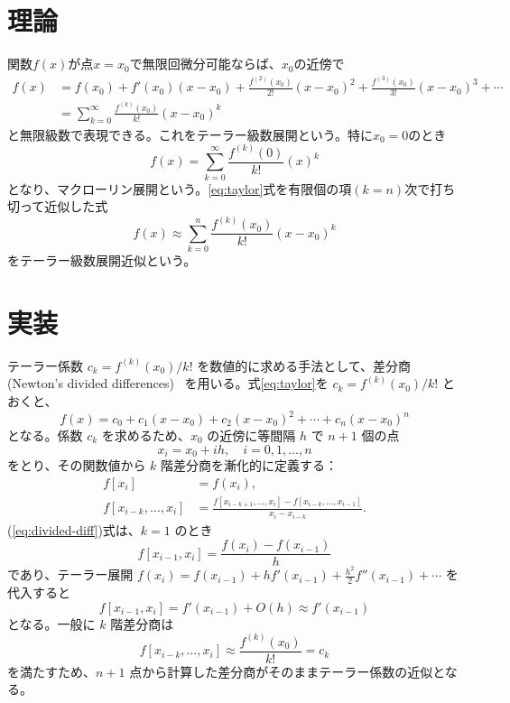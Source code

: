 \documentclass[12pt,a4paper]{ltjsreport}
\begin{document}
\section{理論}
関数$f(x)$が点$x=x_0$で無限回微分可能ならば、$x_0$の近傍で
\begin{equation}\label{eq:taylor}
\begin{split}
f(x) &= f(x_0) + f'(x_0)(x - x_0) + \frac{f^{(2)}(x_0)}{2!}(x - x_0)^2 + \frac{f^{(3)}(x_0)}{3!}(x - x_0)^3 + \cdots \\
&= \sum_{k=0}^{\infty}\frac{f^{(k)}(x_0)}{k!}(x - x_0)^k
\end{split}
\end{equation}
と無限級数で表現できる。これをテーラー級数展開という。特に$x_0 = 0$のとき
\begin{equation}\label{eq:macraulin}
f(x) = \sum_{k=0}^{\infty}\frac{f^{(k)}(0)}{k!}(x)^k
\end{equation}
となり、マクローリン展開という。\ref{eq:taylor}式を有限個の項$(k = n)$次で打ち切って近似した式
\begin{equation}
f(x) \approx \sum_{k=0}^{n}\frac{f^{(k)}(x_0)}{k!}(x - x_0)^k
\end{equation}
をテーラー級数展開近似という。

\section{実装}
テーラー係数 $c_k = f^{(k)}(x_0)/k!$ を数値的に求める手法として、差分商 (Newton's divided differences)~\cite{wikipedia_dd} を用いる。式\ref{eq:taylor}を $c_k = f^{(k)}(x_0)/k!$ とおくと、
\begin{equation}
f(x) = c_0 + c_1(x - x_0) + c_2(x - x_0)^2 + \cdots + c_n (x - x_0)^n
\end{equation}
となる。係数 $c_k$ を求めるため、$x_0$ の近傍に等間隔 $h$ で $n+1$ 個の点
\begin{equation}
x_i = x_0 + i h, \quad i = 0, 1, \ldots, n
\end{equation}
をとり、その関数値から $k$ 階差分商を漸化的に定義する：
\begin{equation}\label{eq:divided-diff}
\begin{split}
f[x_i] &= f(x_i), \\
f[x_{i-k}, \ldots, x_i] &= \frac{f[x_{i-k+1}, \ldots, x_i] - f[x_{i-k}, \ldots, x_{i-1}]}{x_i - x_{i-k}}.
\end{split}
\end{equation}
(\ref{eq:divided-diff})式は、$k=1$ のとき
\begin{equation}
f[x_{i-1}, x_i] = \frac{f(x_i) - f(x_{i-1})}{h}
\end{equation}
であり、テーラー展開 $f(x_i) = f(x_{i-1}) + h f'(x_{i-1}) + \frac{h^2}{2} f''(x_{i-1}) + \cdots$ を代入すると
\begin{equation}
f[x_{i-1}, x_i] = f'(x_{i-1}) + O(h) \approx f'(x_{i-1})
\end{equation}
となる。一般に $k$ 階差分商は
\begin{equation}
f[x_{i-k}, \ldots, x_i] \approx \frac{f^{(k)}(x_0)}{k!} = c_k
\end{equation}
を満たすため、$n+1$ 点から計算した差分商がそのままテーラー係数の近似となる。
\end{document}
